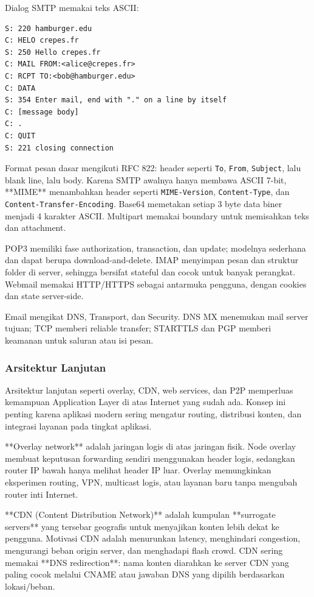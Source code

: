 Dialog SMTP memakai teks ASCII:
\begin{lstlisting}[caption={Dialog SMTP ringkas}, label={lst:smtp-dialog}]
S: 220 hamburger.edu
C: HELO crepes.fr
S: 250 Hello crepes.fr
C: MAIL FROM:<alice@crepes.fr>
C: RCPT TO:<bob@hamburger.edu>
C: DATA
S: 354 Enter mail, end with "." on a line by itself
C: [message body]
C: .
C: QUIT
S: 221 closing connection
\end{lstlisting}

Format pesan dasar mengikuti RFC 822: header seperti \texttt{To}, \texttt{From}, \texttt{Subject}, lalu blank line, lalu body. Karena SMTP awalnya hanya membawa ASCII 7-bit, **MIME** menambahkan header seperti \texttt{MIME-Version}, \texttt{Content-Type}, dan \texttt{Content-Transfer-Encoding}. Base64 memetakan setiap 3 byte data biner menjadi 4 karakter ASCII. Multipart memakai boundary untuk memisahkan teks dan attachment.

POP3 memiliki fase authorization, transaction, dan update; modelnya sederhana dan dapat berupa download-and-delete. IMAP menyimpan pesan dan struktur folder di server, sehingga bersifat stateful dan cocok untuk banyak perangkat. Webmail memakai HTTP/HTTPS sebagai antarmuka pengguna, dengan cookies dan state server-side.

Email mengikat DNS, Transport, dan Security. DNS MX menemukan mail server tujuan; TCP memberi reliable transfer; STARTTLS dan PGP memberi keamanan untuk saluran atau isi pesan.

\subsubsection{Arsitektur Lanjutan}
\begin{jawab}
Arsitektur lanjutan seperti overlay, CDN, web services, dan P2P memperluas kemampuan Application Layer di atas Internet yang sudah ada. Konsep ini penting karena aplikasi modern sering mengatur routing, distribusi konten, dan integrasi layanan pada tingkat aplikasi.
\end{jawab}

**Overlay network** adalah jaringan logis di atas jaringan fisik. Node overlay membuat keputusan forwarding sendiri menggunakan header logis, sedangkan router IP bawah hanya melihat header IP luar. Overlay memungkinkan eksperimen routing, VPN, multicast logis, atau layanan baru tanpa mengubah router inti Internet.

**CDN (Content Distribution Network)** adalah kumpulan **surrogate servers** yang tersebar geografis untuk menyajikan konten lebih dekat ke pengguna. Motivasi CDN adalah menurunkan latency, menghindari congestion, mengurangi beban origin server, dan menghadapi flash crowd. CDN sering memakai **DNS redirection**: nama konten diarahkan ke server CDN yang paling cocok melalui CNAME atau jawaban DNS yang dipilih berdasarkan lokasi/beban.

